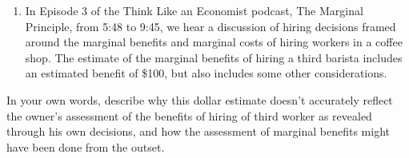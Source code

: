 \documentclass[11pt,]{article}
\providecommand{\tightlist}{%
  \setlength{\itemsep}{0pt}\setlength{\parskip}{0pt}}
\begin{document}
\newpage

\begin{enumerate}
\def\labelenumi{\arabic{enumi}.}
\setcounter{enumi}{3}
\tightlist
\item
  In Episode 3 of the Think Like an Economist podcast, The Marginal
  Principle, from 5:48 to 9:45, we hear a discussion of hiring decisions
  framed around the marginal benefits and marginal costs of hiring
  workers in a coffee shop. The estimate of the marginal benefits of
  hiring a third barista includes an estimated benefit of \$100, but
  also includes some other considerations.
\end{enumerate}

In your own words, describe why this dollar estimate doesn't accurately
reflect the owner's assessment of the benefits of hiring of third worker
as revealed through his own decisions, and how the assessment of
marginal benefits might have been done from the outset.
\end{document}

